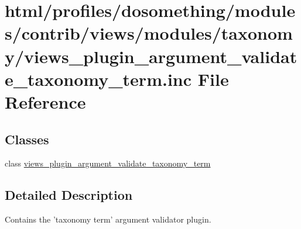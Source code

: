 \hypertarget{views__plugin__argument__validate__taxonomy__term_8inc}{
\section{html/profiles/dosomething/modules/contrib/views/modules/taxonomy/views\_\-plugin\_\-argument\_\-validate\_\-taxonomy\_\-term.inc File Reference}
\label{views__plugin__argument__validate__taxonomy__term_8inc}
}
\subsection*{Classes}
\begin{DoxyCompactItemize}
\item 
class \hyperlink{classviews__plugin__argument__validate__taxonomy__term}{views\_\-plugin\_\-argument\_\-validate\_\-taxonomy\_\-term}
\end{DoxyCompactItemize}


\subsection{Detailed Description}
Contains the 'taxonomy term' argument validator plugin. 